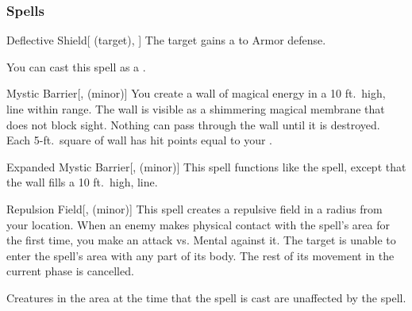 \subsubsection{Spells}


\lowercase{\hypertarget{spell:Deflective Shield}{}}\label{spell:Deflective Shield}
\begin{attuneability}[\nth{1}]{\hypertarget{spell:Deflective Shield}{Deflective Shield}}[ (target), ]
The target gains a   to Armor defense.

You can cast this spell as a .
\end{attuneability}
\vspace{0.25em}



\lowercase{\hypertarget{spell:Mystic Barrier}{}}\label{spell:Mystic Barrier}
\begin{freeability}[\nth{1}]{\hypertarget{spell:Mystic Barrier}{Mystic Barrier}}[,  (minor)]
\targetrule
You create a wall of magical energy in a 10 ft.\ high, \areamed line within \rngmed range.
The wall is visible as a shimmering magical membrane that does not block sight.
Nothing can pass through the wall until it is destroyed.
Each 5-ft.\ square of wall has hit points equal to your .
\end{freeability}
\vspace{0.25em}



\lowercase{\hypertarget{spell:Expanded Mystic Barrier}{}}\label{spell:Expanded Mystic Barrier}
\begin{freeability}[\nth{2}]{\hypertarget{spell:Expanded Mystic Barrier}{Expanded Mystic Barrier}}[,  (minor)]
\targetrule
This spell functions like the  spell, except that the wall fills a 10 ft.\ high, \arealarge line.
\end{freeability}
\vspace{0.25em}



\lowercase{\hypertarget{spell:Repulsion Field}{}}\label{spell:Repulsion Field}
\begin{freeability}[\nth{2}]{\hypertarget{spell:Repulsion Field}{Repulsion Field}}[,  (minor)]
This spell creates a repulsive field in a \areamed radius  from your location.
When an enemy makes physical contact with the spell's area for the first time, you make an attack vs. Mental against it.
\hit The target is unable to enter the spell's area with any part of its body.
The rest of its movement in the current phase is cancelled.

Creatures in the area at the time that the spell is cast are unaffected by the spell.
\end{freeability}
\vspace{0.25em}



